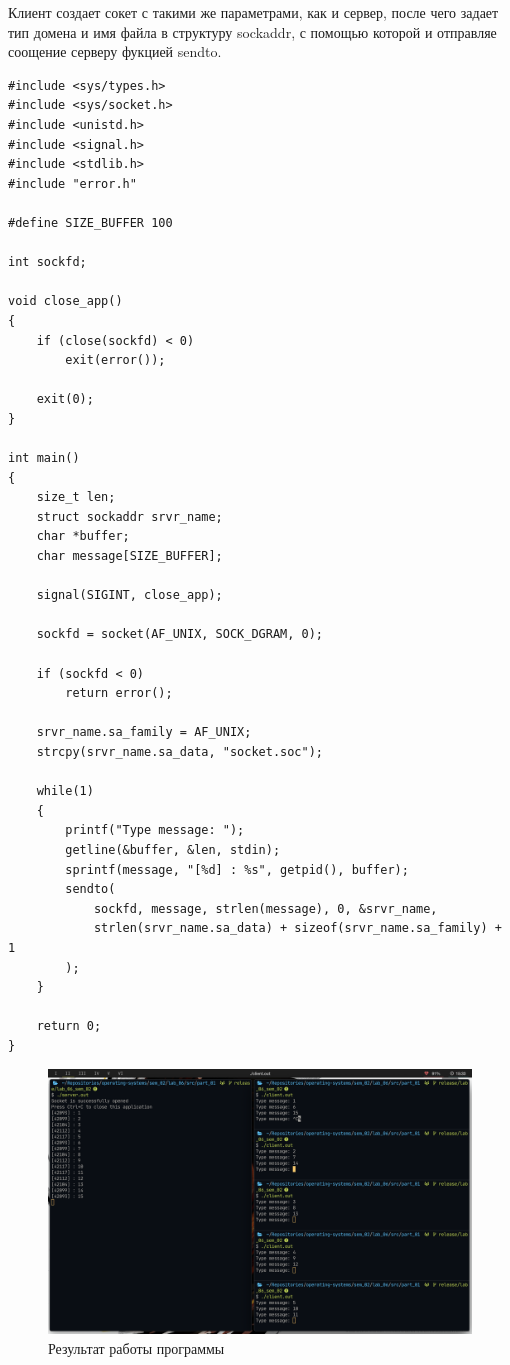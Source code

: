 Клиент создает сокет с такими же параметрами, как и сервер, после чего задает тип домена и имя файла в структуру {\ttfamily sockaddr}, с помощью которой и отправляе соощение серверу фукцией {\ttfamily sendto}.

\begin{lstlisting}[caption=Текст программы клиента]
#include <sys/types.h>
#include <sys/socket.h>
#include <unistd.h>
#include <signal.h>
#include <stdlib.h>
#include "error.h"

#define SIZE_BUFFER 100

int sockfd;

void close_app()
{
    if (close(sockfd) < 0)
        exit(error());

    exit(0);
}

int main()
{
    size_t len;
    struct sockaddr srvr_name;
    char *buffer;
    char message[SIZE_BUFFER];

    signal(SIGINT, close_app);

    sockfd = socket(AF_UNIX, SOCK_DGRAM, 0);

    if (sockfd < 0)
        return error();

    srvr_name.sa_family = AF_UNIX;
    strcpy(srvr_name.sa_data, "socket.soc");

    while(1)
    {
        printf("Type message: ");
        getline(&buffer, &len, stdin);
        sprintf(message, "[%d] : %s", getpid(), buffer);
        sendto(
            sockfd, message, strlen(message), 0, &srvr_name,
            strlen(srvr_name.sa_data) + sizeof(srvr_name.sa_family) + 1
        );
    }

    return 0;
}
\end{lstlisting}

\begin{figure}[H]
    \centering
    \includegraphics[scale=0.4]{img/file_socket.png}
    \caption{Результат работы программы}
\end{figure}

